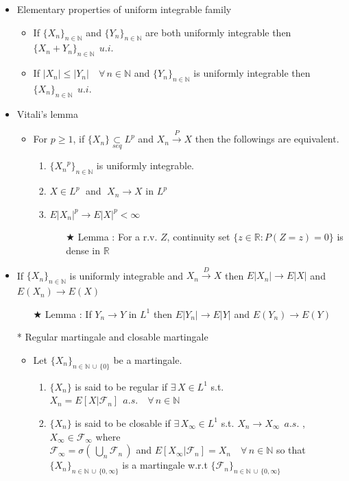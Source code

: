 \documentclass[12pt, A4]{article}
\newcommand{\trick}{$\bigstar$}
\newcommand{\N}{\mathbb{N}}
\newcommand{\R}{\mathbb{R}}
\newcommand{\F}{\mathcal{F}}
\newcommand{\seq}{\underset{seq}{\subset}}
\newcommand{\union}{\,\cup\,}
\newcommand{\exist}{\exists\,}
\newcommand{\convp}{\overset{P}{\rightarrow}}
\newcommand{\convd}{\overset{D}{\rightarrow}}
\newcommand{\foranyn}{\quad \forall \, n\in \N}
\begin{document}
\begin{itemize}
\begin{itemize}
\begin{enumerate}
		\end{enumerate}
	\end{itemize}
	\item Elementary properties of uniform integrable family
	\begin{itemize}
		\item If $\{X_n\}_{n\in \N}$ and $\{Y_n\}_{n\in \N}$ are both uniformly integrable then $\{X_n+Y_n\}_{n\in \N}\;\,u.i.$ 
		\item If $|X_n|\leq |Y_n| \foranyn$ and $\{Y_n\}_{n\in \N}$ is uniformly integrable then $\{X_n\}_{n\in \N}\;\, u.i.$
	\end{itemize} 
	\item Vitali's lemma
	\begin{itemize}
		\item For $p\geq 1$, if $\{X_n\}\seq L^p$ and $X_n\convp X$ then the followings are equivalent.
		\begin{enumerate}
			\item $\{{X_n}^p\}_{n\in \N}$ is uniformly integrable.
			\item $X\in L^p\;$ and $\;X_n\rightarrow X$ in $L^p$
			\item $E|X_n|^p\rightarrow E|X|^p<\infty$
			\begin{itemize}
				\item[\trick] Lemma : For a r.v. $Z$, continuity set $\{z\in \R : P(Z=z)=0\}$ is dense in $\R$
			\end{itemize}
		\end{enumerate}
	\end{itemize}
	\item If $\{X_n\}_{n\in \N}$ is uniformly integrable and $X_n\convd X$ then $E|X_n|\rightarrow E|X|$ and $E(X_n)\rightarrow E(X)$
	\begin{itemize}
		\item[\trick] Lemma : If $Y_n\rightarrow Y$ in $L^1$ then $E|Y_n|\rightarrow E|Y|$ and $E(Y_n)\rightarrow E(Y)$
	\end{itemize}
	\item[*] Regular martingale and closable martingale
	\begin{itemize}
		\item Let $\{X_n\}_{n\in \N\union \{0\}}$ be a martingale.
		\begin{enumerate}
			\item $\{X_n\}$ is said to be regular if $\exist X\in L^1$ s.t. $X_n=E[X|\F_n]\;\,a.s.\foranyn$
			\item $\{X_n\}$ is said to be closable if $\exist X_\infty\in L^1$ s.t. $X_n\rightarrow X_\infty\;\,a.s.$ , $X_\infty\in \F_\infty$ where \\$\F_\infty=\sigma(\,\bigcup_n \F_n\,)$ and  $E[X_\infty|\F_n]=X_n\foranyn$ so that \\ $\{X_n\}_{n\in \N\union \{0, \infty\}}$ is a martingale w.r.t $\{\F_n\}_{n\in \N\union \{0, \infty \}}$ 

\end{enumerate}
\end{itemize}
\end{itemize}
\end{document}
